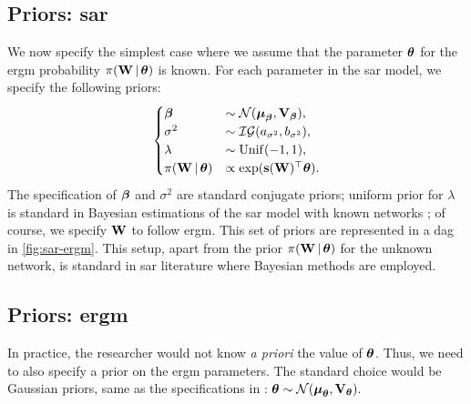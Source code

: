 \documentclass[a4paper]{article}
\begin{document}


\subsection{Priors: \gls{sar}}\label{sec:prior-sar}

We now specify the simplest case
where we assume that the parameter $\boldsymbol{\theta}$ for the \gls{ergm} probability $\pi(\mathbf{W}\,|\,\boldsymbol{\theta})$ is known.
For each parameter in the \gls{sar} model, we specify the following priors:
\begin{align}\label{eq:prior}
	\begin{cases}
		\boldsymbol{\beta}                &\sim    \mathcal{N}(\boldsymbol{\mu}_{\boldsymbol{\beta}},\mathbf{V}_{\boldsymbol{\beta}}), \\
		\sigma^2              &\sim    \mathcal{IG}(a_{\sigma^2},b_{\sigma^2}), \\
		\lambda               &\sim    \mathrm{Unif}(-1,1), \\
		\pi(\mathbf{W}\,|\,\boldsymbol{\theta}) &\propto \exp(\mathbf{s}(\mathbf{W})^\top\boldsymbol{\theta}).
	\end{cases}
\end{align}
The specification of $\boldsymbol{\beta}$ and $\sigma^2$ are standard conjugate priors;
uniform prior for $\lambda$ is standard in Bayesian estimations of the \gls{sar} model
with known networks \parencite{lesage-pace-2009};
of course, we specify $\mathbf{W}$ to follow \gls{ergm}.
This set of priors are represented in a \gls{dag} in \autoref{fig:sar-ergm}.
This setup, apart from the prior $\pi(\mathbf{W}\,|\,\boldsymbol{\theta})$ for the unknown network,
is standard in \gls{sar} literature where Bayesian methods are employed.

\subsection{Priors: \gls{ergm}}\label{sec:prior-ergm}

In practice, the researcher would not know \emph{a priori} the value of $\boldsymbol{\theta}$.
Thus, we need to also specify a prior on the \gls{ergm} parameters.
The standard choice would be Gaussian priors,
same as the specifications in \cite{caimo-friel-2011}:
$\boldsymbol{\theta} \sim \mathcal{N}(\boldsymbol{\mu}_{\boldsymbol{\theta}},\mathbf{V}_{\boldsymbol{\theta}}).$

\end{document}
